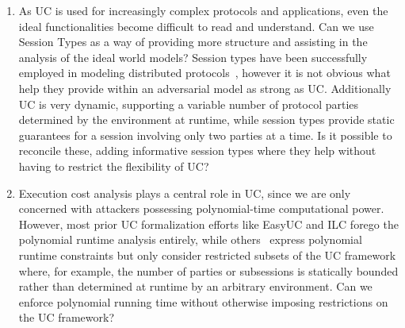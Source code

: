 \begin{enumerate}
\item 
As UC is used for increasingly complex protocols and applications, even the ideal functionalities become difficult to read and understand.
Can we use Session Types as a way of providing more structure and assisting in the analysis of the ideal world models?
Session types have been successfully employed in modeling distributed protocols~\cite{das2018work,dasnomos}, however it is not obvious what help they provide within an adversarial model as strong as UC.
Additionally UC is very dynamic, supporting a variable number of protocol parties determined by the environment at runtime, while session types provide static guarantees for a session involving only two parties at a time.
Is it possible to reconcile these, adding informative session types where they help without having to restrict the flexibility of UC?

\item Execution cost analysis plays a central role in UC, since we are only concerned with
attackers possessing polynomial-time computational power.
However, most prior UC formalization efforts like EasyUC and ILC forego the polynomial runtime analysis entirely, while others~\cite{ipdl,barbosa,ilc} express polynomial runtime constraints but only consider restricted subsets of the UC framework where, for example, the number of parties or subsessions is statically bounded rather than determined at runtime by an arbitrary environment.
Can we enforce polynomial running time without otherwise imposing restrictions on the UC framework?

\end{enumerate}


